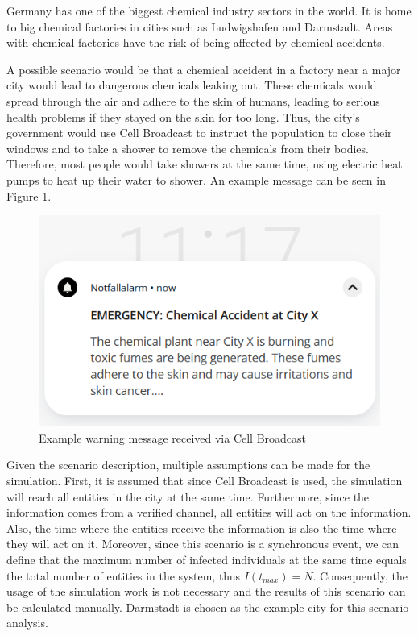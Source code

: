 Germany has one of the biggest chemical industry sectors in the world.
It is home to big chemical factories in cities such as Ludwigshafen and
Darmstadt. Areas with chemical factories have the risk of being
affected by chemical accidents.

A possible scenario would be that a chemical accident in a 
factory near a major city would lead to dangerous chemicals 
leaking out. These chemicals would spread through the air 
and adhere to the skin of humans, leading to serious 
health problems if they stayed on the skin for too long.
Thus, the city's government would use Cell Broadcast to
instruct the population to close their windows and 
to take a shower to remove the chemicals from their bodies.
Therefore, most people would take showers at the same time,
using electric heat pumps to heat up their water to shower.
An example message can be seen in Figure \ref{warningmessage}.

\begin{figure}[!ht]
    \center
    \includegraphics[scale=.7]{figs/emergencychemical.png}
    \caption{Example warning message received via Cell Broadcast}
    \label{warningmessage}
\end{figure}

Given the scenario description, multiple assumptions can be
made for the simulation.
First, it is assumed that since Cell Broadcast is used, the simulation
will reach all entities in the city at the same time.
Furthermore, since the information comes from a verified channel,
all entities will act on the information. Also, the time where the
entities receive the information is also the time where they will act
on it.
Moreover, since this scenario is a synchronous event, we can define that the
maximum number of infected individuals at the same time equals
the total number of entities in the system, thus $I(t_{max})=N$.
Consequently, the usage of the simulation work is not necessary
and the results of this scenario can be calculated manually.
Darmstadt is chosen as the example city for this scenario analysis.

